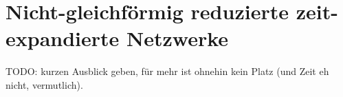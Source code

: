 \section{Nicht-gleichförmig reduzierte zeit-expandierte Netzwerke}\label{sec:nonunif_cond}
TODO: kurzen Ausblick geben, für mehr ist ohnehin kein Platz (und Zeit eh nicht,
vermutlich).
